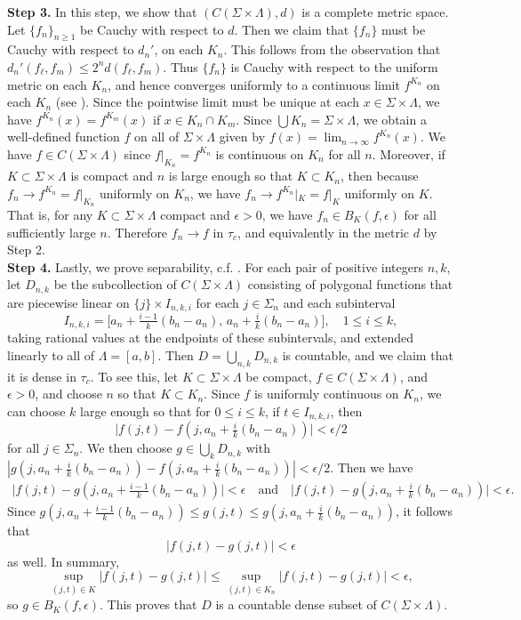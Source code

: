 \noindent\textbf{Step 3.} In this step, we show that $(C(\Sigma\times\Lambda), d)$ is a complete metric space. Let $\{f_n\}_{n\geq 1}$ be Cauchy with respect to $d$. Then we claim that $\{f_n\}$ must be Cauchy with respect to $d_n'$, on each $K_n$. This follows from the observation that $ d_n'(f_\ell, f_m) \leq 2^n d(f_\ell, f_m)$. Thus $\{f_n\}$ is Cauchy with respect to the uniform metric on each $K_n$, and hence converges uniformly to a continuous limit $f^{K_n}$ on each $K_n$ (see \cite[Theorem 7.15]{Rudin}). Since the pointwise limit must be unique at each $x\in \Sigma\times\Lambda$, we have $f^{K_n}(x) = f^{K_m}(x)$ if $x\in K_n\cap K_m$. Since $\bigcup K_n = \Sigma\times\Lambda$, we obtain a well-defined function $f$ on all of $\Sigma\times\Lambda$ given by $f(x)=\lim_{n\to\infty} f^{K_n}(x)$. We have $f\in C(\Sigma\times\Lambda)$ since $f|_{K_n} = f^{K_n}$ is continuous on $K_n$ for all $n$. Moreover, if $K\subset\Sigma\times\Lambda$ is compact and $n$ is large enough so that $K\subset K_n$, then because $f_n \to f^{K_n} = f|_{K_n}$ uniformly on $K_n$, we have $f_n \to f^{K_n}|_K = f|_K$ uniformly on $K$. That is, for any $K\subset\Sigma\times\Lambda$ compact and $\epsilon>0$, we have $f_n \in B_K(f,\epsilon)$ for all sufficiently large $n$. Therefore $f_n \to f$ in $\tau_c$, and equivalently in the metric $d$ by Step 2.\\

\noindent\textbf{Step 4.} Lastly, we prove separability, c.f. \cite[Example 1.3]{Billing}. For each pair of positive integers $n,k$, let $D_{n,k}$ be the subcollection of $C(\Sigma\times\Lambda)$ consisting of polygonal functions that are piecewise linear on $\{j\}\times I_{n,k,i}$ for each $j\in\Sigma_n$ and each subinterval 
\[
I_{n,k,i} = \big[a_n+\tfrac{i-1}{k}(b_n-a_n), \, a_n+\tfrac{i}{k}(b_n-a_n)\big], \quad 1\leq i\leq k,
\] 
taking rational values at the endpoints of these subintervals, and extended linearly to all of $\Lambda = [a,b]$. Then $D = \bigcup_{n,k} D_{n,k}$ is countable, and we claim that it is dense in $\tau_c$. To see this, let $K\subset\Sigma\times\Lambda$ be compact, $f\in C(\Sigma\times\Lambda)$, and $\epsilon>0$, and choose $n$ so that $K\subset K_n$. Since $f$ is uniformly continuous on $K_n$, we can choose $k$ large enough so that for $0\leq i\leq k$, if $t\in I_{n,k,i}$, then 
\[
\big|f(j,t) - f(j, a_n + \tfrac{i}{k}(b_n-a_n))\big| < \epsilon/2
\]
for all $j\in\Sigma_n$. We then choose $g\in \bigcup_k D_{n,k}$ with $|g(j,a_n + \frac{i}{k}(b_n-a_n)) - f(j,a_n + \frac{i}{k}(b_n-a_n))| < \epsilon/2$. Then we have 
\begin{align*}
	\big|f(j,t) - g(j, a_n + \tfrac{i-1}{k}(b_n-a_n))\big| < \epsilon \quad \mathrm{and} \quad \big|f(j,t) - g(j, a_n + \tfrac{i}{k}(b_n-a_n))\big| < \epsilon.
\end{align*}
Since $g(j, a_n + \tfrac{i-1}{k}(b_n-a_n)) \leq g(j,t) \leq g(j, a_n + \tfrac{i}{k}(b_n-a_n))$, it follows that 
\[
|f(j,t) - g(j,t)| < \epsilon
\]
as well. In summary,
\[
\sup_{(j,t)\in K} |f(j,t)-g(j,t)| \leq \sup_{(j,t)\in K_n} |f(j,t)-g(j,t)| < \epsilon,
\] 
so $g\in B_K(f,\epsilon)$. This proves that $D$ is a countable dense subset of $C(\Sigma\times\Lambda)$.


